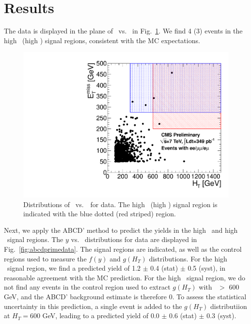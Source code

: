 \section{Results}
\label{sec:results}

The data is displayed in the plane of \MET\ vs. \Ht\ in Fig.~\ref{fig:met_ht}.
We find 4 (3) events in the high \MET\ (high \Ht) signal regions, consistent
with the MC expectations. 

\begin{figure}[tbh]
\begin{center}
\includegraphics[width=0.65\linewidth]{plots_final/met_ht_349pb.pdf}
\caption{\label{fig:met_ht}\protect Distributions of \MET\ vs.\ \HT\   
for data. The high \MET\ (high \Ht) signal region is indicated with the
blue dotted (red striped) region.}
\end{center}
\end{figure}

Next, we apply the ABCD' method to predict the yields in the high \met\ and high \Ht\
signal regions. 
The $y$ vs. \Ht\ distributions for data are displayed in 
Fig.~\ref{fig:abcdprimedata}. 
The signal regions are indicated, as well as the control 
regions used to measure the $f(y)$ and $g(H_T)$ distributions. 
For the high \met\
signal region, we find a predicted yield of 1.2 $\pm$ 0.4 (stat) $\pm$ 0.5 (syst), 
in reasonable agreement with the MC prediction. For the high \Ht\ signal region, we 
do not find any events in the control region used to extract $g(H_T)$ with \Ht\ $>$ 600 GeV,
and the ABCD' background estimate is therefore 0. To assess the statistical uncertainty
in this prediction, a single event is added to the $g(H_T)$ distributiion
at $H_T = 600$ GeV, leading to a predicted yield of 0.0 $\pm$ 0.6 (stat) $\pm$ 0.3 (syst).

